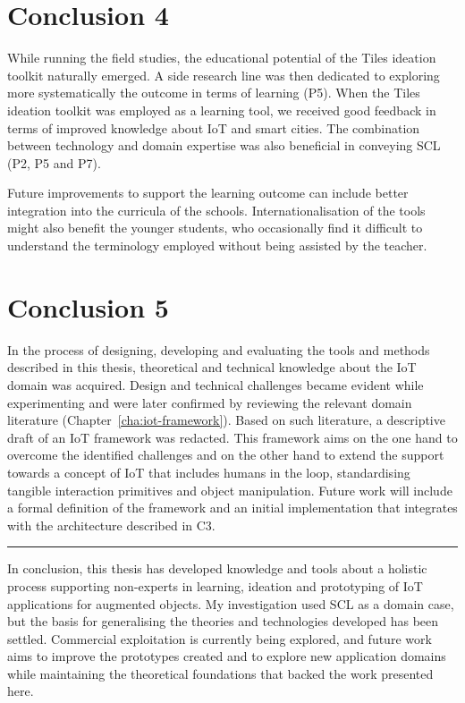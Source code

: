 \section*{Conclusion 4}

While running the field studies, the educational potential of the Tiles ideation toolkit naturally emerged. A side research line was then dedicated to exploring more systematically the outcome in terms of learning (P5). When the Tiles ideation toolkit was employed as a learning tool, we received good feedback in terms of improved knowledge about IoT and smart cities. The combination between technology and domain expertise was also beneficial in conveying SCL (P2, P5 and P7).

Future improvements to support the learning outcome can include better integration into the curricula of the schools. Internationalisation of the tools might also benefit the younger students, who occasionally find it difficult to understand the terminology employed without being assisted by the teacher.


\section*{Conclusion 5}

In the process of designing, developing and evaluating the tools and methods described in this thesis, theoretical and technical knowledge about the IoT domain was acquired. Design and technical challenges became evident while experimenting and were later confirmed by reviewing the relevant domain literature (Chapter~\ref{cha:iot-framework}). Based on such literature, a descriptive draft of an IoT framework was redacted. This framework aims on the one hand to overcome the identified challenges and on the other hand to extend the support towards a concept of IoT that includes humans in the loop, standardising tangible interaction primitives and object manipulation. Future work will include a formal definition of the framework and an initial implementation that integrates with the architecture described in C3.

\bigskip
\begin{center}
\noindent\rule{8cm}{0.4pt}    
\end{center}
\bigskip

In conclusion, this thesis has developed knowledge and tools about a holistic process supporting non-experts in learning, ideation and prototyping of IoT applications for augmented objects. My investigation used SCL as a domain case, but the basis for generalising the theories and technologies developed has been settled.
Commercial exploitation is currently being explored, and future work aims to improve the prototypes created and to explore new application domains while maintaining the theoretical foundations that backed the work presented here.
